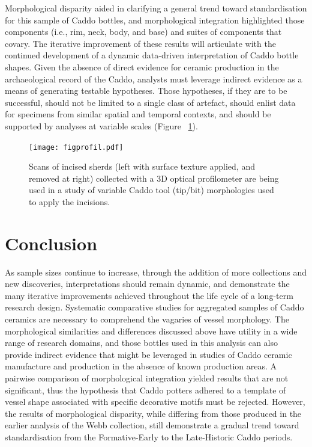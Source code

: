 \documentclass[review]{elsarticle}
\begin{document}
Morphological disparity aided in clarifying a general trend toward standardisation for this sample of Caddo bottles, and morphological integration highlighted those components (i.e., rim, neck, body, and base) and suites of components that covary. The iterative improvement of these results will articulate with the continued development of a dynamic data-driven interpretation of Caddo bottle shapes. Given the absence of direct evidence for ceramic production in the archaeological record of the Caddo, analysts must leverage indirect evidence as a means of generating testable hypotheses. Those hypotheses, if they are to be successful, should not be limited to a single class of artefact, should enlist data for specimens from similar spatial and temporal contexts, and should be supported by analyses at variable scales (Figure ~\ref{fig:profil}).

\begin{figure}[ht]\centering
\texttt{[image: figprofil.pdf]}
\caption{Scans of incised sherds (left with surface texture applied, and removed at right) collected with a 3D optical profilometer are being used in a study of variable Caddo tool (tip/bit) morphologies used to apply the incisions.}
\label{fig:profil}
\end{figure}

\section{Conclusion}

As sample sizes continue to increase, through the addition of more collections and new discoveries, interpretations should remain dynamic, and demonstrate the many iterative improvements achieved throughout the life cycle of a long-term research design. Systematic comparative studies for aggregated samples of Caddo ceramics are necessary to comprehend the vagaries of vessel morphology. The morphological similarities and differences discussed above have utility in a wide range of research domains, and those bottles used in this analysis can also provide indirect evidence that might be leveraged in studies of Caddo ceramic manufacture and production in the absence of known production areas. A pairwise comparison of morphological integration yielded results that are not significant, thus the hypothesis that Caddo potters adhered to a template of vessel shape associated with specific decorative motifs must be rejected. However, the results of morphological disparity, while differing from those produced in the earlier analysis of the Webb collection, still demonstrate a gradual trend toward standardisation from the Formative-Early to the Late-Historic Caddo periods.
\end{document}
